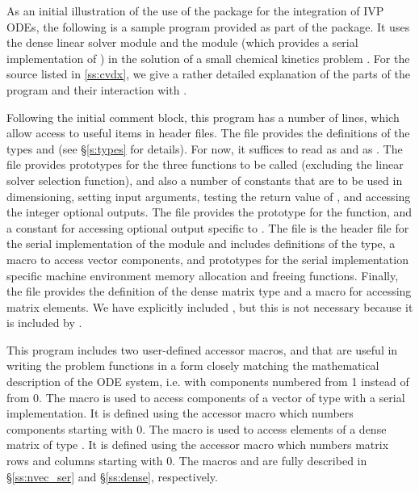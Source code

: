 As an initial illustration of the use of the {\cvodes} package for the
integration of IVP ODEs, the following is a sample program provided as part 
of the package.  It uses the {\cvodes} dense linear solver module {\cvdense} 
and the {\nvecs} module (which provides a serial implementation of {\nvector})
in the solution of a small chemical kinetics problem
.
For the source listed in \A\ref{ss:cvdx}, we give a rather detailed explanation of 
the parts of the program and their interaction with {\cvodes}.

Following the initial comment block, this program has a number
of  lines, which allow access to useful items in {\cvodes}
header files.  The  file provides the definitions of the
types  and  (see \S\ref{s:types} for
details).  For now, it suffices to read  as  and
 as .
The  file provides prototypes for the three {\cvodes}
functions to be called (excluding the linear solver selection
function), and also a number of constants that are to be used in
dimensioning, setting input arguments, testing the return value of
, and accessing the integer optional outputs.
The  file provides the prototype for the  
function, and a constant  for accessing optional output 
specific to {\cvdense}.  
The  file is the header file for the serial implementation
of the {\nvector} module and includes definitions of the 
 type, a macro to access vector components, and prototypes 
for the serial implementation specific machine environment memory allocation
and freeing functions.
Finally, the  file provides the definition of the dense
matrix type  and a macro for accessing matrix elements.
We have explicitly included , but this is not necessary because 
it is included by .

This program includes two user-defined accessor macros,
 and 
that are useful in writing the problem functions in a form closely
matching the mathematical description of the ODE system, i.e. with
components numbered from 1 instead of from 0. 
The  macro is used to access components of a vector of type 
with a serial implementation. 
It is defined using the {\nvecs} accessor macro  which numbers components 
starting with 0. The  macro is used to access elements of a dense matrix of
type . It is defined using the {\dense} accessor macro 
which numbers matrix rows and columns starting with 0. The macros
 and  are fully described in  \S\ref{ss:nvec_ser} and
\S\ref{ss:dense}, respectively.

